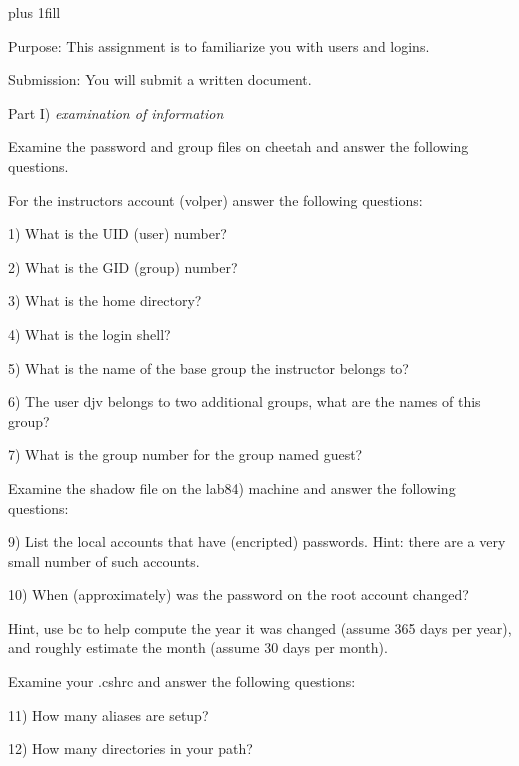 
\rightskip=0pt plus 1fill

\parindent 0pt

Purpose: This assignment is to familiarize you with users and logins.

Submission: You will submit a written document.

Part I) {\it examination of information}

Examine the password and group files on {\ltt{}cheetah}
and answer the following questions.

For the instructors account ({\ltt{}volper}) answer the following
questions:

1) What is the UID (user) number?

2) What is the GID (group) number?

3) What is the home directory?

4) What is the login shell?

5) What is the name of the base group the instructor belongs to?

6) The user {\ltt{}djv} belongs to two additional groups,
what are the names of this group?

7) What is the group number for the group named guest?

Examine the shadow file on the {\ltt{}lab84}) machine
and answer the following questions:

9) List the local accounts that have (encripted) passwords.
Hint: there are a very small number of such accounts.

10) When (approximately) was the password on the root account changed?

Hint, use bc to help compute the year it was changed (assume
365 days per year), and roughly estimate the month 
(assume 30 days per month).

Examine your {\ltt{}.cshrc} and answer the following questions:

11) How many aliases are setup?

12) How many directories in your path?

\bye
